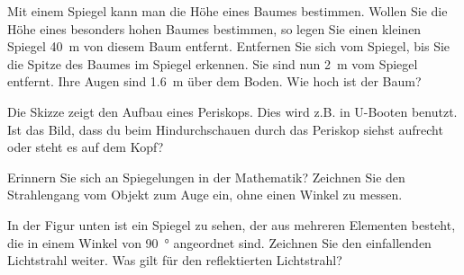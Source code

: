 \documentclass[paper=a4,twoside=true,,DIV13,BCOR1cm]{scrartcl}
\begin{document}
\begin{aufgabe}
	Mit einem Spiegel kann man die Höhe eines Baumes bestimmen. Wollen Sie die Höhe eines besonders hohen Baumes bestimmen,
	so legen Sie einen kleinen Spiegel \SI{40}{m} von diesem Baum entfernt. Entfernen Sie sich vom Spiegel, bis Sie die
	Spitze des Baumes im Spiegel erkennen. Sie sind nun \SI{2}{m} vom Spiegel entfernt. Ihre Augen sind \SI{1.6}{m} über dem Boden.
	Wie hoch ist der Baum?
\end{aufgabe}

\begin{minipage}{0.5\textwidth}
\begin{aufgabe}
	Die Skizze zeigt den Aufbau eines Periskops. Dies wird z.B. in U-Booten benutzt. Ist das Bild, dass du beim Hindurchschauen
	durch das Periskop siehst aufrecht oder steht es auf dem Kopf?
\end{aufgabe}
\end{minipage}
\begin{minipage}{0.5\textwidth}

\end{minipage}


\begin{aufgabe}
Erinnern Sie sich an Spiegelungen in der Mathematik? Zeichnen Sie den Strahlengang vom Objekt zum Auge ein, ohne einen Winkel zu messen.\\	
\end{aufgabe}

\begin{aufgabe}
	In der Figur unten ist ein Spiegel zu sehen, der aus mehreren Elementen besteht, die in einem Winkel von \SI{90}{\degree}
	angeordnet sind. Zeichnen Sie den einfallenden Lichtstrahl weiter. Was gilt für den reflektierten Lichtstrahl?


\end{aufgabe}
\end{document}
